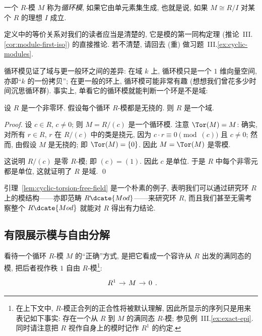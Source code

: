 \begin{definition}\label{def:cyclic-module}
一个 $R$-模 $M$ 称为\emph{循环模}, 如果它由单元素集生成, 也就是说, 如果 $M\cong R/I$ 对某个 $R$ 的理想 $I$ 成立.
\end{definition}

定义中的等价关系对我们的读者应当是清楚的, 它是模的第一同构定理 (推论~III.\ref{cor:module-first-iso}) 的直接推论. 若不清楚, 请回去 (重) 做习题~III.\ref{ex:cyclic-modules}.

循环模见证了域与更一般环之间的差异: 在域 $k$ 上, 循环模只是一个 $1$ 维向量空间, 亦即“$k$ 的一份拷贝”; 在更一般的环上, 循环模可能非常有趣 (想想我们曾花多少时间沉思循环群). 事实上, 单看它的循环模就能判断一个环是不是域:

\begin{lemma}\label{lem:cyclic-torsion-free-field}
设 $R$ 是一个非零环. 假设每个循环 $R$-模都是无挠的. 则 $R$ 是一个域.
\end{lemma}

\begin{proof}
设 $c\in R$, $c\neq 0$; 则 $M=R/(c)$ 是一个循环模. 注意 $\Tor(M)=M$: 确实, 对所有 $r\in R$, $r$ 在 $R/(c)$ 中的类是挠元, 因为 $c\cdot r\equiv 0\pmod{(c)}$ 且 $c\neq 0$; 然而, 由假设 $M$ 是无挠的; 即 $\Tor(M)=\{0\}$. 因此 $M=\Tor(M)$ 是零模.

这说明 $R/(c)$ 是零 $R$-模; 即 $(c)=(1)$. 因此 $c$ 是单位. 于是 $R$ 中每个非零元都是单位, 这就证明了 $R$ 是域. \qed
\end{proof}

引理~\ref{lem:cyclic-torsion-free-field} 是一个朴素的例子, 表明我们可以通过研究环 $R$ 上的模结构——亦即范畴 $R\dcate{Mod}$——来研究环 $R$, 而且我们甚至无需考察整个 $R\dcate{Mod}$ 就能对 $R$ 得出有力结论.

\subsection{有限展示模与自由分解}\label{subsec:finitely-presented}

看待一个循环 $R$-模 $M$ 的“正确”方式, 是把它看成一个容许从 $R$ 出发的满同态的模, 把后者视作秩 $1$ 自由 $R$-模\footnote{在上下文中, $R$-模正合列的正合性将被默认理解, 因此所显示的序列只是用来表记如下事实: 存在一个从 $R$ 到 $M$ 的满同态 $R$-模; 参见例~III.\ref{ex:exact-epi}. 同时请注意把 $R$ 视作自身上的模时记作 $R^1$ 的约定.}:
$$
\begin{tikzcd}[column sep=.9em]
R^1 \ar[r] & M \ar[r] & 0
\end{tikzcd}.
$$

